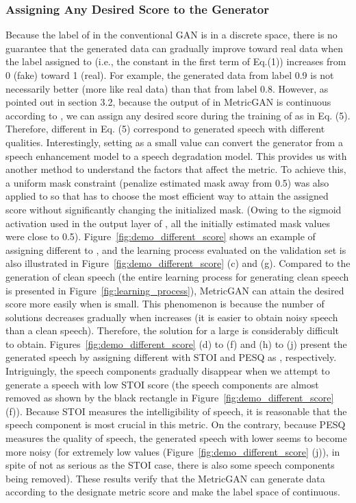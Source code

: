 \documentclass{article}
\begin{document}
\subsubsection{Assigning Any Desired Score to the Generator}
Because the label of  in the conventional GAN is in a discrete space, there is no guarantee that the generated data can gradually improve toward real data when the label assigned to  (i.e., the constant in the first term of Eq.(1)) increases  from 0 (fake) toward 1 (real). For example, the generated data from label 0.9 is not necessarily better (more like real data) than that from label 0.8.
However, as pointed out in section 3.2, because the output of  in MetricGAN is continuous according to , we can assign any desired score during the training of  as in Eq. (5). Therefore, different  in Eq. (5) correspond to generated speech with different qualities. Interestingly, setting  as a small value can convert the generator from a speech enhancement model to a speech degradation model. This provides us with another method to understand the factors that affect the metric. To achieve this, a uniform mask constraint (penalize estimated mask away from 0.5) was also applied to  so that  has to choose the most efficient way to attain the assigned score  without significantly changing the initialized mask. (Owing to the sigmoid activation used in the output layer of , all the initially estimated mask values were close to 0.5). Figure~\ref{fig:demo_different_score} shows an example of assigning different  to , and the learning process evaluated on the validation set is also illustrated in Figure~\ref{fig:demo_different_score} (c) and (g). Compared to the generation of clean speech (the entire learning process for generating clean speech is presented in Figure~\ref{fig:learning_process}), MetricGAN can attain the desired score more easily when  is small. This phenomenon is because the number of solutions decreases gradually when  increases (it is easier to obtain noisy speech than a clean speech). Therefore, the solution for a large  is considerably difficult to obtain. Figures~\ref{fig:demo_different_score} (d) to (f) and (h) to (j) present the generated speech by assigning different  with STOI and PESQ as , respectively. Intriguingly, the speech components gradually disappear when we attempt to generate a speech with low STOI score (the speech components are almost removed as shown by the black rectangle in Figure~\ref{fig:demo_different_score} (f)). Because STOI measures the intelligibility of speech, it is reasonable that the speech component is most crucial in this metric. On the contrary, because PESQ measures the quality of speech, the generated speech with lower  seems to become more noisy (for extremely low  values (Figure~\ref{fig:demo_different_score} (j)), in spite of not as serious as the STOI case, there is also some speech components being removed). These results verify that the MetricGAN can generate data according to the designate metric score and make the label space of  continuous.
\end{document}
